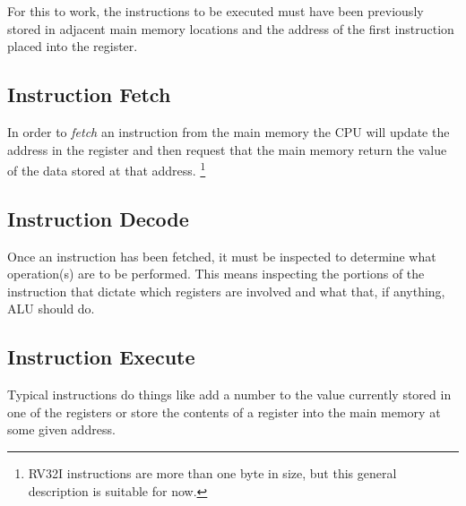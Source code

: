 For this to work, the instructions to be executed must have been previously 
stored in adjacent main memory locations and the address of the first instruction 
placed into the  register.


\subsection{Instruction Fetch}

In order to {\em fetch} an instruction from the main memory the CPU
will update the address in the  register and then request that
the main memory return the value of the data stored at that address.
\footnote{RV32I instructions are more than one byte in size, but 
this general description is suitable for now.}





\subsection{Instruction Decode}

Once an instruction has been fetched, it must be inspected to determine what
operation(s) are to be performed.  This means inspecting the portions of the 
instruction that dictate which registers are involved and what that, if 
anything, ALU should do.

\subsection{Instruction Execute}

Typical instructions do things like add a number to the value
currently stored in one of the registers or store the contents of a
register into the main memory at some given address.

